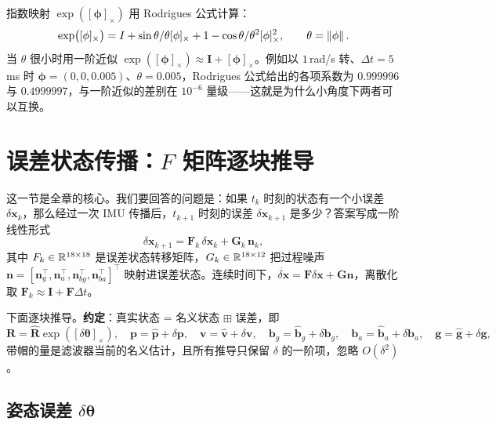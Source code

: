 指数映射 $\exp([\bm{\phi}]_\times)$ 用 Rodrigues 公式计算：
\begin{equation}\label{eq:17-rodrigues}
  \exp\bigl([\phi]_\times\bigr)=I+\sin\theta/\theta[\phi]_\times+1-\cos\theta/\theta^2[\phi]_\times^2,\qquad \theta=\left\lVert \phi \right\rVert.
\end{equation}
当 $\theta$ 很小时用一阶近似 $\exp([\bm{\phi}]_\times)\approx\bm{I}+[\bm{\phi}]_\times$。例如以 $1$\,rad/s 转、$\Delta t=5$\,ms 时 $\bm{\phi}=(0,0,0.005)$、$\theta=0.005$，Rodrigues 公式给出的各项系数为 $0.999996$ 与 $0.4999997$，与一阶近似的差别在 $10^{-6}$ 量级——这就是为什么小角度下两者可以互换。

\section{误差状态传播：$F$ 矩阵逐块推导}\label{sec:17-f}

这一节是全章的核心。我们要回答的问题是：如果 $t_k$ 时刻的状态有一个小误差 $\delta\bm{x}_k$，那么经过一次 IMU 传播后，$t_{k+1}$ 时刻的误差 $\delta\bm{x}_{k+1}$ 是多少？答案写成一阶线性形式
\begin{equation}\label{eq:17-f-linear}
  \delta\bm{x}_{k+1}=\bm{F}_k\,\delta\bm{x}_k+\bm{G}_k\,\bm{n}_k,
\end{equation}
其中 $F_k\in\mathbb{R}^{18\times18}$ 是误差状态转移矩阵，$G_k\in\mathbb{R}^{18\times12}$ 把过程噪声 $\bm{n}=[\bm{n}_g^{\top},\bm{n}_a^{\top},\bm{n}_{bg}^{\top},\bm{n}_{ba}^{\top}]^{\top}$ 映射进误差状态。连续时间下，$\dot{\delta\bm{x}}=\bm{F}\delta\bm{x}+\bm{G}\bm{n}$，离散化取 $\bm{F}_k\approx\bm{I}+\bm{F}\Delta t$。

下面逐块推导。\textbf{约定}：真实状态 = 名义状态 $\boxplus$ 误差，即
\begin{equation}
  \bm{R}=\hat{\bm{R}}\exp([\delta\bm{\theta}]_\times),\quad
  \bm{p}=\hat{\bm{p}}+\delta\bm{p},\quad
  \bm{v}=\hat{\bm{v}}+\delta\bm{v},\quad
  \bm{b}_g=\hat{\bm{b}}_g+\delta\bm{b}_g,\quad
  \bm{b}_a=\hat{\bm{b}}_a+\delta\bm{b}_a,\quad
  \bm{g}=\hat{\bm{g}}+\delta\bm{g},
\end{equation}
带帽的量是滤波器当前的名义估计，且所有推导只保留 $\delta$ 的一阶项，忽略 $O(\delta^2)$。

\subsection{姿态误差 $\delta\bm{\theta}$}

